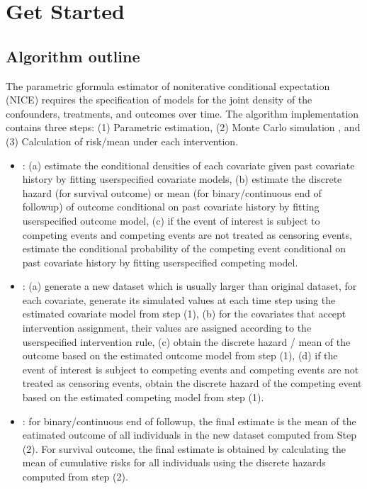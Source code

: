 \documentclass[letterpaper,10pt,english]{sphinxmanual}
\begin{document}
\chapter{Get Started}
\label{\detokenize{Get Started:get-started}}\label{\detokenize{Get Started::doc}}

\section{Algorithm outline}
\label{\detokenize{Get Started:algorithm-outline}}
\sphinxAtStartPar
The parametric g\sphinxhyphen{}formula estimator of noniterative conditional expectation (NICE) requires
the specification of models for the joint density of the confounders, treatments, and outcomes over time.
The algorithm implementation contains three steps: (1) Parametric estimation, (2) Monte Carlo simulation
, and (3) Calculation of risk/mean under each intervention.
\begin{itemize}
\item {} 
\sphinxAtStartPar
{}: (a) estimate the conditional densities of each covariate given past covariate history
by fitting user\sphinxhyphen{}specified covariate models, (b) estimate the discrete hazard (for survival outcome) or mean
(for binary/continuous end of follow\sphinxhyphen{}up) of outcome conditional on past covariate history by fitting user\sphinxhyphen{}specified outcome model,
(c) if the event of interest is subject to competing events and competing events are not treated as censoring events, estimate the conditional probability of the competing event
conditional on past covariate history by fitting user\sphinxhyphen{}specified competing model.

\item {} 
\sphinxAtStartPar
{}: (a) generate a new dataset which is usually larger than original dataset, for each covariate,
generate its simulated values at each time step using the estimated covariate model from step (1), (b) for the
covariates that accept intervention assignment, their values are assigned according to the user\sphinxhyphen{}specified intervention rule,
(c) obtain the discrete hazard / mean of the outcome based on the estimated outcome model from step (1),
(d) if the event of interest is subject to competing events and competing events are not treated as censoring events,
obtain the discrete hazard of the competing event based on the estimated competing model from step (1).

\item {} 
\sphinxAtStartPar
{}: for binary/continuous end of follow\sphinxhyphen{}up, the final estimate is the mean of
the eatimated outcome of all individuals in the new dataset computed from Step (2). For survival outcome,
the final estimate is obtained by calculating the mean of cumulative risks for all individuals using the discrete hazards computed from step (2).

\end{itemize}
\end{document}
